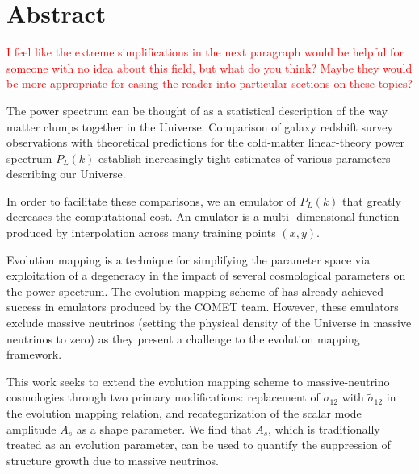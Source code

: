 

\chapter*{Abstract}

\begin{comment}
The color code in this document: \textcolor{blue}{Explanations to the
proofreader; we'll simply cut these out shortly before submission.}
\textcolor{orange}{Notes to myself--I don't need input here, I just need time
to plan and execute.} \textcolor{green}{I need to add citations / 
justification for the claims here, either by generating more plots or by going
back and looking through the papers I used to get started with this project.}
\textcolor{red}{I have some confusion about this area and I would appreciate
feedback from the proofreader.}
\end{comment}

\textcolor{red}{I feel like the extreme simplifications in the next paragraph
would be helpful for someone with no idea about this field, but what do you
think? Maybe they would be more appropriate for easing the reader into
particular sections on these topics?}

The power spectrum can be thought of as a statistical description of the way 
matter clumps together in the Universe.
Comparison of galaxy redshift survey observations with theoretical predictions 
for the cold-matter linear-theory power spectrum $P_L (k)$ establish
increasingly tight estimates of various parameters describing our Universe.

In order to facilitate these comparisons, we an emulator of $P_L (k)$
that greatly decreases the computational cost. An emulator is a multi-
dimensional function produced by interpolation across many training points $
(x, y)$.

Evolution mapping is a technique for simplifying the parameter space via
exploitation of a degeneracy in the impact of several cosmological parameters
on the power spectrum. The evolution mapping scheme of  has 
already achieved success in emulators produced by the COMET team.
However, these emulators exclude massive neutrinos
(setting the physical density of the Universe in massive neutrinos to zero)
as they present a challenge to the evolution mapping framework.

This work seeks to extend the evolution mapping scheme to massive-neutrino 
cosmologies through two primary modifications: replacement of $\sigma_{12}$
with $\tilde{\sigma}_{12}$ in the evolution mapping relation, and
recategorization of the scalar mode amplitude $A_s$ as a shape parameter.
We find that $A_s$, which is traditionally treated as an evolution parameter, 
can be used to quantify the suppression of structure 
growth due to massive neutrinos.

